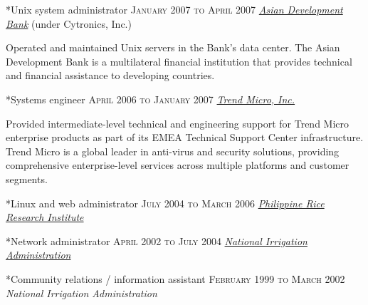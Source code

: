 \documentclass[10pt, a4paper, final]{article}
\begin{document}
\begin{minipage}[t]{0.65\linewidth}
\begin{section}
    \begin{subsection}*{Unix system administrator \hfill\textsc{January 2007 to April 2007}}
      \href{http://www.adb.org}{\textit{Asian Development Bank}} (under Cytronics, Inc.) 

      Operated and maintained Unix servers in the Bank's data center. The Asian Development Bank is a multilateral financial institution that provides technical and financial assistance to developing countries.
    \end{subsection}
    \vspace{1em}
  
    \begin{subsection}*{Systems engineer \hfill\textsc{April 2006 to January 2007}}
      \href{http://www.trendmicro.com}{\textit{Trend Micro, Inc.}}  

      Provided intermediate-level technical and engineering support for Trend Micro enterprise products as part of its EMEA Technical Support Center infrastructure. Trend Micro is a global leader in anti-virus and security solutions, providing comprehensive enterprise-level services across multiple platforms and customer segments.
    \end{subsection}
    \vspace{1em}
  
    \begin{subsection}*{Linux and web administrator \hfill\textsc{July 2004 to March 2006}}
      \href{http://www.philrice.gov.ph}{\textit{Philippine Rice Research Institute}}  
    \end{subsection}
    \vspace{1em}
  
    \begin{subsection}*{Network administrator \hfill\textsc{April 2002 to July 2004}}
      \href{http://www.nia.gov.ph}{\textit{National Irrigation Administration}}  
    \end{subsection}
    \vspace{1em}
  
    \begin{subsection}*{Community relations / information assistant \hfill\textsc{February 1999 to March 2002}}
      \textit{National Irrigation Administration} 
    \end{subsection}
    \vspace{1em}
  \end{section}
\end{minipage}
\end{document}
